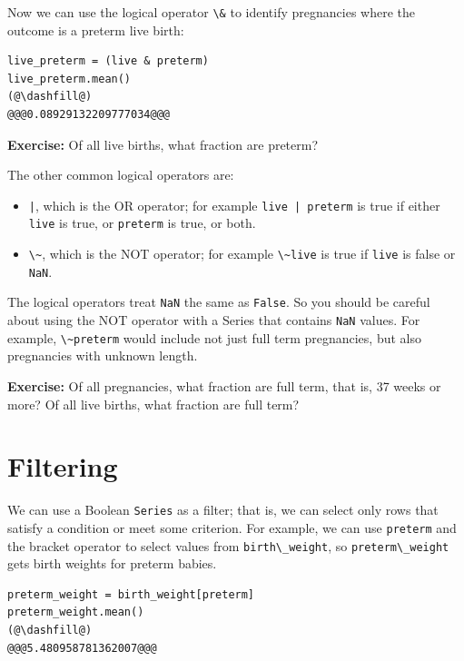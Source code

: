 Now we can use the logical operator \passthrough{\lstinline!\&!} to
identify pregnancies where the outcome is a preterm live birth:

\begin{lstlisting}[]
live_preterm = (live & preterm)
live_preterm.mean()
(@\dashfill@)
@@@0.08929132209777034@@@
\end{lstlisting}

\textbf{Exercise:} Of all live births, what fraction are preterm?

The other common logical operators are:

\begin{itemize}
\item
  \passthrough{\lstinline!|!}, which is the OR operator; for example
  \passthrough{\lstinline!live | preterm!} is true if either
  \passthrough{\lstinline!live!} is true, or
  \passthrough{\lstinline!preterm!} is true, or both.
\item
  \passthrough{\lstinline!\~!}, which is the NOT operator; for example
  \passthrough{\lstinline!\~live!} is true if
  \passthrough{\lstinline!live!} is false or
  \passthrough{\lstinline!NaN!}.
\end{itemize}

The logical operators treat \passthrough{\lstinline!NaN!} the same as
\passthrough{\lstinline!False!}. So you should be careful about using
the NOT operator with a Series that contains
\passthrough{\lstinline!NaN!} values. For example,
\passthrough{\lstinline!\~preterm!} would include not just full term
pregnancies, but also pregnancies with unknown length.

\textbf{Exercise:} Of all pregnancies, what fraction are full term, that
is, 37 weeks or more? Of all live births, what fraction are full term?

\hypertarget{filtering}{%
\section{Filtering}\label{filtering}}

We can use a Boolean \passthrough{\lstinline!Series!} as a filter; that
is, we can select only rows that satisfy a condition or meet some
criterion. For example, we can use \passthrough{\lstinline!preterm!} and
the bracket operator to select values from
\passthrough{\lstinline!birth\_weight!}, so
\passthrough{\lstinline!preterm\_weight!} gets birth weights for preterm
babies.

\begin{lstlisting}[]
preterm_weight = birth_weight[preterm]
preterm_weight.mean()
(@\dashfill@)
@@@5.480958781362007@@@
\end{lstlisting}


